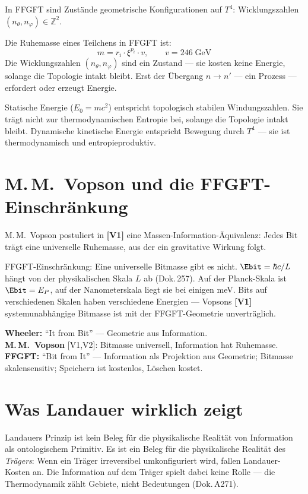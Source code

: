 In FFGFT sind Zustände geometrische Konfigurationen auf $T^4$:
Wicklungszahlen $(n_\theta, n_\varphi) \in \mathbb{Z}^2$.

Die Ruhemasse eines Teilchens in FFGFT ist:
\[
  m = r_i \cdot \xi^{p_i} \cdot v, \qquad v = 246\;\text{GeV}
\]
Die Wicklungszahlen $(n_\theta, n_\varphi)$ sind ein Zustand --- sie kosten
keine Energie, solange die Topologie intakt bleibt. Erst der Übergang
$n \to n'$ --- ein Prozess --- erfordert oder erzeugt Energie.

Statische Energie ($E_0 = mc^2$) entspricht topologisch stabilen
Windungszahlen. Sie trägt nicht zur thermodynamischen Entropie bei,
solange die Topologie intakt bleibt. Dynamische kinetische Energie
entspricht Bewegung durch $T^4$ --- sie ist thermodynamisch und
entropieproduktiv.

\section{M.\,M.~Vopson und die FFGFT-Einschränkung}

M.\,M.~Vopson postuliert in \textbf{[V1]} eine Massen-Information-Äquivalenz: Jedes Bit
trägt eine universelle Ruhemasse, aus der ein gravitative Wirkung folgt.

FFGFT-Einschränkung: Eine universelle Bitmasse gibt es nicht.
$\Ebit = \hbar c / L$ hängt von der physikalischen Skala $L$ ab (Dok.\,257).
Auf der Planck-Skala ist $\Ebit = E_P$, auf der Nanometerska\-la liegt sie
bei einigen meV. Bits auf verschiedenen Skalen haben verschiedene Energien ---
Vopsons \textbf{[V1]} systemunabhängige Bitmasse ist mit der FFGFT-Geometrie unverträglich.

\begin{ffgftbox}
\textbf{Wheeler:} \enquote{It from Bit} --- Geometrie aus Information.\\
\textbf{M.\,M.~Vopson} {[V1,V2]}: Bitmasse universell, Information hat Ruhemasse.\\
\textbf{FFGFT:} \enquote{Bit from It} --- Information als Projektion aus
Geometrie; Bitmasse skalensensitiv; Speichern ist kostenlos, Löschen kostet.
\end{ffgftbox}

\section{Was Landauer wirklich zeigt}

Landauers Prinzip ist kein Beleg für die physikalische Realität von
Information als ontologischem Primitiv. Es ist ein Beleg für die physikalische
Realität des \emph{Trägers}: Wenn ein Träger irreversibel umkonfiguriert wird,
fallen Landauer-Kosten an. Die Information auf dem Träger spielt dabei keine
Rolle --- die Thermodynamik zählt Gebiete, nicht Bedeutungen (Dok.\,A271).
